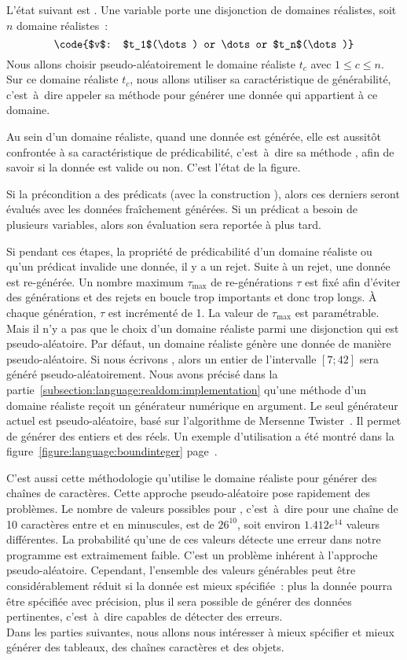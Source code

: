 L'état suivant est . Une variable porte une disjonction de domaines
réalistes, soit $n$ domaine réalistes~:
%
$$\code{$v$: $t_1$(\dots) or \dots or $t_n$(\dots)}$$
%
Nous allons choisir pseudo-aléatoirement le domaine réaliste $t_c$ avec $1 \leq
c \leq n$. Sur ce domaine réaliste $t_c$, nous allons utiliser sa
caractéristique de générabilité, c'est~à~dire appeler sa méthode 
pour générer une donnée qui appartient à ce domaine.

Au sein d'un domaine réaliste, quand une donnée est générée, elle est aussitôt
confrontée à sa caractéristique de prédicabilité, c'est~à~dire sa méthode
, afin de savoir si la donnée est valide ou non. C'est l'état
 de la figure.

Si la précondition a des prédicats (avec la construction ), alors ces
derniers seront évalués avec les données fraîchement générées. Si un prédicat a
besoin de plusieurs variables, alors son évaluation sera reportée à plus tard.

Si pendant ces étapes, la propriété de prédicabilité d'un domaine réaliste ou
qu'un prédicat invalide une donnée, il y a un {\strong rejet}. Suite à un rejet,
une donnée est re-générée. Un nombre maximum $\tau_\mathrm{max}$ de
re-générations $\tau$ est fixé afin d'éviter des générations et des rejets en
boucle trop importants et donc trop longs. À chaque génération, $\tau$ est
incrémenté de 1. La valeur de $\tau_\mathrm{max}$ est paramétrable. \\

Mais il n'y a pas que le choix d'un domaine réaliste parmi une disjonction qui
est pseudo-aléatoire. Par défaut, un domaine réaliste génère une donnée de
manière pseudo-aléatoire.  Si nous écrivons , alors un
entier de l'intervalle $[7; 42]$ sera généré pseudo-aléatoirement. Nous avons
précisé dans la partie~\ref{subsection:language:realdom:implementation} qu'une
méthode  d'un domaine réaliste reçoit un générateur numérique en
argument. Le seul générateur actuel est pseudo-aléatoire, basé sur l'algorithme
de Mersenne Twister~. Il permet de générer des entiers et
des réels. Un exemple d'utilisation a été montré dans la
figure~\ref{figure:language:boundinteger}
page~\pageref{figure:language:boundinteger}.

C'est aussi cette méthodologie qu'utilise le domaine réaliste  pour
générer des chaînes de caractères. Cette approche pseudo-aléatoire pose
rapidement des problèmes. Le nombre de valeurs possibles pour , c'est~à~dire pour une chaîne de 10 caractères entre  et
 en minuscules, est de $26^{10}$, soit environ $1.412e^{14}$ valeurs
différentes. La probabilité qu'une de ces valeurs détecte une erreur dans notre
programme est extraimement faible. C'est un problème inhérent à l'approche
pseudo-aléatoire. Cependant, l'ensemble des valeurs générables peut être
considérablement réduit si la donnée est mieux spécifiée~: plus la donnée pourra
être spécifiée avec précision, plus il sera possible de générer des données
pertinentes, c'est~à~dire capables de détecter des erreurs. \\

Dans les parties suivantes, nous allons nous intéresser à mieux spécifier et
mieux générer des tableaux, des chaînes caractères et des objets.
